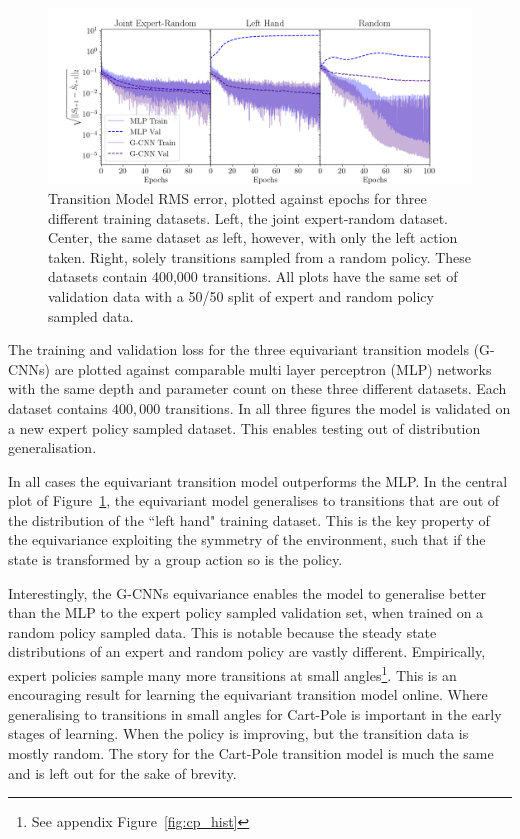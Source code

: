 \documentclass[mlabstract]{jmlr}
\begin{document}
\begin{figure}
	\centering
	\includegraphics[width=.65\textwidth]{Figures/transition_model_loss.png}
	\caption{Transition Model RMS error, plotted against epochs for three different training
		datasets. Left, the joint expert-random dataset. Center, the same dataset as
		left, however, with only the left action taken. Right, solely transitions sampled
		from a random policy. These datasets contain 400,000 transitions. All plots have
		the same set of validation data with a 50/50 split of expert and random policy
		sampled data.}\label{fig:tm_cp}
\end{figure}

The training and validation loss for the three equivariant transition models (G-CNNs) are plotted against comparable multi layer perceptron (MLP) networks with the same depth and parameter count on these three different datasets. Each dataset contains $400,000$ transitions. In all three figures the model is validated on a new expert policy sampled dataset. This enables testing out of distribution generalisation.

In all cases the equivariant transition model outperforms the MLP. In the central plot of Figure~\ref{fig:tm_cp}, the equivariant model generalises to transitions that are out of the distribution of the ``left hand" training dataset. This is the key property of the equivariance exploiting the symmetry of the environment, such that if the state is transformed by a group action so is the policy.

Interestingly, the G-CNNs equivariance enables the model to generalise better than the MLP to the expert policy sampled validation set, when trained on a random policy sampled data. This is notable because the steady state distributions of an expert and random policy are vastly different. Empirically, expert policies sample many more transitions at small angles\footnote{See appendix Figure~\ref{fig:cp_hist}}. This is an encouraging result for learning the equivariant transition model online. Where generalising to transitions in small angles for Cart-Pole is important in the early stages of learning. When the policy is improving, but the transition data is mostly random. The story for the Cart-Pole transition model is much the same and is left out for the sake of brevity.
\end{document}
